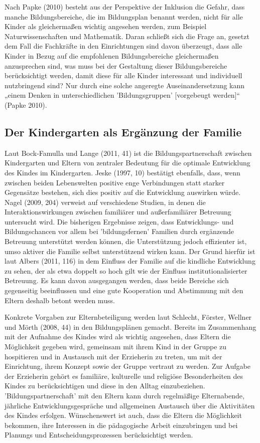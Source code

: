 Nach Papke (2010) besteht aus der Perspektive der Inklusion die Gefahr, dass manche Bildungsbereiche, die im Bildungsplan benannt werden, nicht für alle Kinder als gleichermaßen wichtig angesehen werden, zum Beispiel Naturwissenschaften und Mathematik. Daran schließt sich die Frage an, gesetzt dem Fall die Fachkräfte in den Einrichtungen sind davon überzeugt, dass alle Kinder in Bezug auf die empfohlenen Bildungsbereiche gleichermaßen anzusprechen sind, was muss bei der Gestaltung dieser Bildungsbereiche berücksichtigt werden, damit diese für alle Kinder interessant und individuell nutzbringend sind? Nur durch eine solche angeregte Auseinandersetzung kann „einem Denken in unterschiedlichen 'Bildungsgruppen' [vorgebeugt werden]“ (Papke 2010).
 
\subsection{Der Kindergarten als Ergänzung der Familie}
Laut Bock-Famulla und Lange (2011, 41) ist die Bildungspartnerschaft zwischen Kindergarten und Eltern von zentraler Bedeutung für die optimale Entwicklung des Kindes im Kindergarten. Jeske (1997, 10) bestätigt ebenfalls, dass, wenn zwischen beiden Lebenswelten positive enge Verbindungen statt starker Gegensätze bestehen, sich dies positiv auf die Entwicklung auswirken würde. Nagel (2009, 204) verweist auf verschiedene Studien, in denen die Interaktionswirkungen zwischen familiärer und außerfamiliärer Betreuung untersucht wird. Die bisherigen Ergebnisse zeigen, dass Entwicklungs- und Bildungschancen vor allem bei ’bildungsfernen’ Familien durch ergänzende Betreuung unterstützt werden können, die Unterstützung jedoch effizienter ist, umso aktiver die Familie selbst unterstützend wirken kann. Der Grund hierfür ist laut Albers (2011, 116) in dem Einfluss der Familie auf die kindliche Entwicklung zu sehen, der als etwa doppelt so hoch gilt wie der Einfluss institutionalisierter Betreuung. Es kann davon ausgegangen werden, dass beide Bereiche sich gegenseitig beeinflussen und eine gute Kooperation und Abstimmung mit den Eltern deshalb betont werden muss. 

Konkrete Vorgaben zur Elternbeteiligung werden laut Schlecht, Förster, Wellner und Mörth (2008, 44) in den Bildungsplänen gemacht. Bereits im Zusammenhang mit der Aufnahme des Kindes wird als wichtig angesehen, dass Eltern die Möglichkeit gegeben wird, gemeinsam mit ihrem Kind in der Gruppe zu hospitieren und in Austausch mit der Erzieherin zu treten, um mit der Einrichtung, ihrem Konzept sowie der Gruppe vertraut zu werden. Zur Aufgabe der Erzieherin gehört es familiäre, kulturelle und religiöse Besonderheiten des Kindes zu berücksichtigen und diese in den Alltag einzubeziehen. 'Bildungspartnerschaft' mit den Eltern kann durch regelmäßige Elternabende, jährliche Entwicklungsgespräche und allgemeinen Austausch über die Aktivitäten des Kindes erfolgen. Wünschenswert ist auch, dass die Eltern die Möglichkeit bekommen, ihre Interessen in die pädagogische Arbeit einzubringen und bei Planungs\- und Entscheidungsprozessen berücksichtigt werden.

